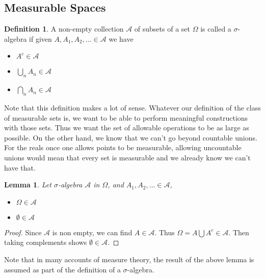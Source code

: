 \documentclass{amsart}
\newtheorem{lem}[thm]{Lemma}
\theoremstyle{remark}
\theoremstyle{definition}
\newtheorem{defn}[thm]{Definition}
\begin{document}
\subsection{Measurable Spaces}
\begin{defn}A non-empty collection $\mathcal{A}$ of subsets of a set
  $\Omega$ is called a $\sigma$-algebra if given $A, A_1, A_2, \dots
  \in  \mathcal{A}$ we have
\begin{itemize}
\item[(i)]$A^c \in \mathcal{A}$
\item[(ii)]$\bigcup_n A_n \in \mathcal{A}$
\item[(iii)]$\bigcap_n A_n \in \mathcal{A}$
\end{itemize}
\end{defn}
Note that this definition makes a lot of sense.  Whatever our
definition of the class of measurable sets is, we want to be able to
perform meaningful constructions with those sets.  Thus we want the
set of allowable operations to be as large as possible.  On the other
hand, we know that we can't go beyond countable unions. For the
reals once one allows points to be measurable, allowing uncountable unions would
mean that every set is measurable and we already know we can't have that.
\begin{lem}Let $\sigma$-algebra $\mathcal{A}$ in $\Omega$, and $A_1,
  A_2, \dots \in \mathcal{A}$,
\begin{itemize}
\item[(i)] $\Omega \in \mathcal{A}$
\item[(ii)] $\emptyset \in \mathcal{A}$
\end{itemize}
\end{lem}
\begin{proof}
Since $\mathcal{A}$ is non empty, we can find $A \in \mathcal{A}$.
Thus $\Omega = A \bigcup A^c \in \mathcal{A}$.  Then taking
complements shows $\emptyset \in \mathcal{A}$.
\end{proof}
Note that in many accounts of measure theory, the result of the above lemma is assumed as part of
the definition of a $\sigma$-algebra.
\end{document}
